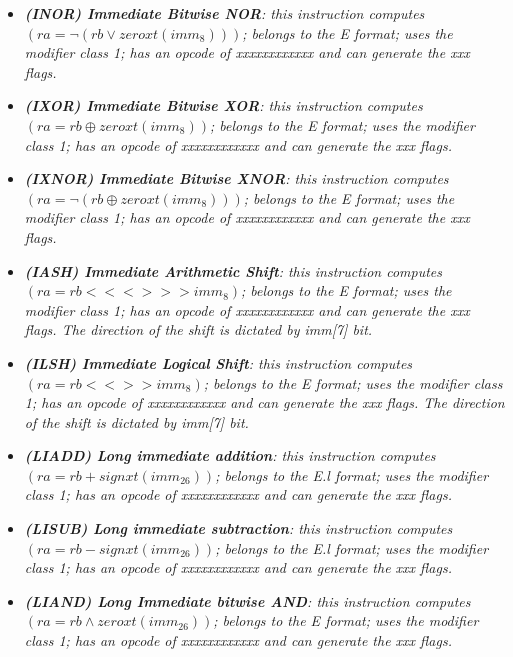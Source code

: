 \begin{multicols}{2}
\begin{itemize}
                \item \textit{\textbf{(INOR) Immediate Bitwise NOR}: this instruction computes \((ra = \neg(rb \vee zeroxt(imm_8)))\); belongs to the E format; uses the modifier class 1; has an opcode of xxxxxxxxxxxx and can generate the xxx flags.}

                \item \textit{\textbf{(IXOR) Immediate Bitwise XOR}: this instruction computes \((ra = rb \oplus zeroxt(imm_8))\); belongs to the E format; uses the modifier class 1; has an opcode of xxxxxxxxxxxx and can generate the xxx flags.}

                \item \textit{\textbf{(IXNOR) Immediate Bitwise XNOR}: this instruction computes \((ra = \neg(rb \oplus zeroxt(imm_8)))\); belongs to the E format; uses the modifier class 1; has an opcode of xxxxxxxxxxxx and can generate the xxx flags.}

                \item \textit{\textbf{(IASH) Immediate Arithmetic Shift}: this instruction computes \((ra = rb <<<>>> imm_8)\); belongs to the E format; uses the modifier class 1; has an opcode of xxxxxxxxxxxx and can generate the xxx flags. The direction of the shift is dictated by imm[7] bit.}

                \item \textit{\textbf{(ILSH) Immediate Logical Shift}: this instruction computes \((ra = rb <<>> imm_8)\); belongs to the E format; uses the modifier class 1; has an opcode of xxxxxxxxxxxx and can generate the xxx flags. The direction of the shift is dictated by imm[7] bit.}

                \item \textit{\textbf{(LIADD) Long immediate addition}: this instruction computes \((ra = rb + signxt(imm_{26}))\); belongs to the E.l format; uses the modifier class 1; has an opcode of xxxxxxxxxxxx and can generate the xxx flags.}

                \item \textit{\textbf{(LISUB) Long immediate subtraction}: this instruction computes \((ra = rb - signxt(imm_{26}))\); belongs to the E.l format; uses the modifier class 1; has an opcode of xxxxxxxxxxxx and can generate the xxx flags.}

                \item \textit{\textbf{(LIAND) Long Immediate bitwise AND}: this instruction computes \((ra = rb \wedge zeroxt(imm_{26}))\); belongs to the E format; uses the modifier class 1; has an opcode of xxxxxxxxxxxx and can generate the xxx flags.}


\end{itemize}
\end{multicols}
